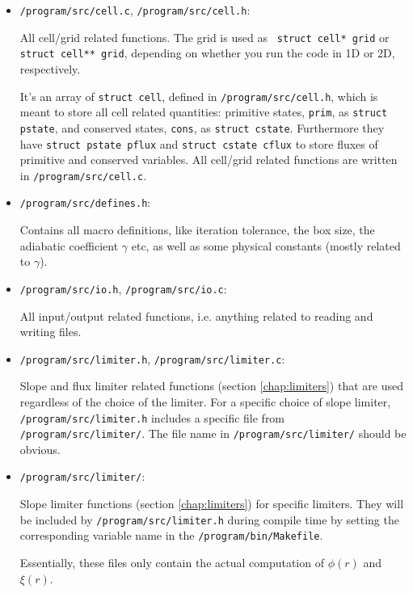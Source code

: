 \begin{itemize}
	\item 	\texttt{/program/src/cell.c}, \texttt{/program/src/cell.h}: 
	
			All cell/grid related functions.
			The grid is used as \texttt{ struct cell* grid} or \texttt{struct cell** grid}, depending on whether you run the code in 1D or 2D, respectively.

			It's an array of \texttt{struct cell}, defined in \texttt{/program/src/cell.h}, which is meant to store all cell related quantities: primitive states, \texttt{prim}, as  \texttt{struct pstate}, and conserved states, \texttt{cons}, as \texttt{struct cstate}.
			Furthermore they have \texttt{struct pstate pflux} and \texttt{struct cstate cflux} to store fluxes of primitive and conserved variables.
			All cell/grid related functions are written in \texttt{/program/src/cell.c}.	
			

	\item 	\texttt{/program/src/defines.h}:
	
			Contains all macro definitions, like iteration tolerance, the box size, the adiabatic coefficient $\gamma$ etc, as well as some physical constants (mostly related to $\gamma$).
			
	\item 	\texttt{/program/src/io.h}, \texttt{/program/src/io.c}:
	
			All input/output related functions, i.e. anything related to reading and writing files.
			
	\item 	\texttt{/program/src/limiter.h}, \texttt{/program/src/limiter.c}:
	
			Slope and flux limiter related functions (section \ref{chap:limiters}) that are used regardless of the choice of the limiter.
			For a specific choice of slope limiter, \texttt{/program/src/limiter.h} includes a specific file from \texttt{/program/src/limiter/}.
			The file name in \texttt{/program/src/limiter/} should be obvious.
			
	\item 	\texttt{/program/src/limiter/}:
	
			Slope limiter functions (section \ref{chap:limiters}) for specific limiters.
			They will be included by \texttt{/program/src/limiter.h} during compile time by setting the corresponding variable name in the \texttt{/program/bin/Makefile}.
			
			Essentially, these files only contain the actual computation of $\phi(r)$ and $\xi(r)$.
			

\end{itemize}
